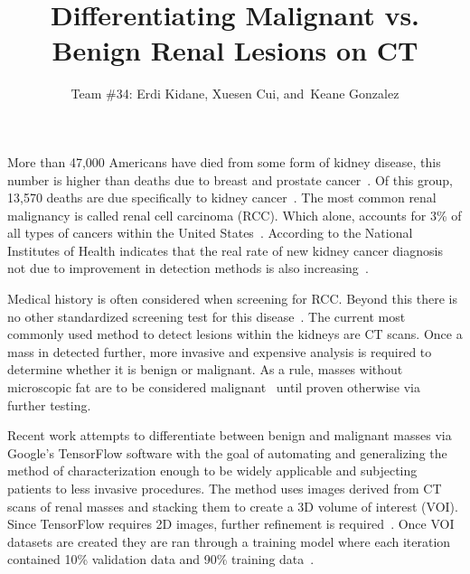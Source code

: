 \documentclass[10pt,journal,compsoc]{IEEEtran}
\begin{document}
\title{Differentiating Malignant vs. Benign Renal Lesions on CT
}  %

\author{Team \#34: Erdi Kidane,
        Xuesen Cui,
        and~Keane Gonzalez}  %

\maketitle


\IEEEPARstart
{M}{ore} than 47,000 Americans have died from some form of kidney disease, this number is higher than deaths due to breast and prostate cancer~\cite{cite1}. Of this group, 13,570 deaths are due specifically to kidney cancer~\cite{cite2}.  The most common renal malignancy is called renal cell carcinoma (RCC).  Which alone, accounts for 3\% of all types of cancers within the United States~\cite{cite3}. According to the National Institutes of Health indicates that the real rate of new kidney cancer diagnosis not due to improvement in detection methods is also increasing~\cite{cite3}.

Medical history is often considered when screening for RCC.  Beyond this there is no other standardized screening test for this disease~\cite{cite4}.  The current most commonly used method to detect lesions within the kidneys are CT scans.  Once a mass in detected further, more invasive and expensive analysis is required to determine whether it is benign or malignant.  As a rule, masses without microscopic fat are to be considered malignant~\cite{cite5} until proven otherwise via further testing.

Recent work attempts to differentiate between benign and malignant masses via Google’s TensorFlow software with the goal of automating and generalizing the method of characterization enough to be widely applicable and subjecting patients to less invasive procedures.   The method uses images derived from CT scans of renal masses and stacking them to create a 3D volume of interest (VOI).  Since TensorFlow requires 2D images, further refinement is required~\cite{cite5}. Once VOI datasets are created they are ran through a training model where each iteration contained 10\% validation data and 90\% training data~\cite{cite5}.
\end{document}
